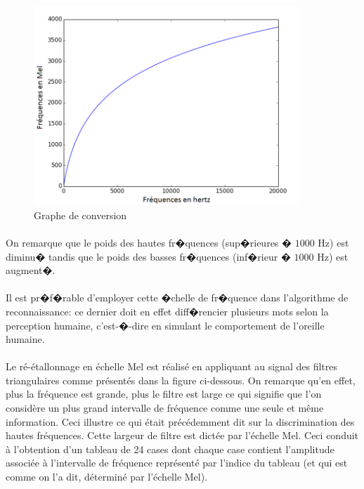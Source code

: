         	\begin{figure}[H]
						\begin{center}
							\includegraphics[width=10cm]{Images/Mel.png} 
						\end{center}
						\caption{Graphe de conversion}
			\end{figure}
        	\paragraph{}
        	On remarque que le poids des hautes fr�quences (sup�rieures � $1 000$ Hz) est diminu� tandis que le poids des basses fr�quences (inf�rieur � $1 000$ Hz) est augment�.
\paragraph{}
	Il est pr�f�rable d'employer cette �chelle de fr�quence dans l'algorithme de reconnaissance: ce dernier doit en effet diff�rencier plusieurs mots selon la perception humaine, c'est-�-dire en simulant le comportement de l'oreille humaine.

\paragraph{}
	Le ré-étallonnage en échelle Mel est réalisé en appliquant au signal des filtres triangulaires comme présentés
	dans la figure ci-dessous. On remarque qu'en effet, plus la fréquence est grande, plus le filtre est large ce qui 
	signifie que l'on considère un plus grand intervalle de fréquence comme une seule et même information. Ceci 
	illustre ce qui était précédemment dit sur la discrimination des hautes fréquences. Cette largeur de filtre est 
	dictée par l'échelle Mel. Ceci conduit à l'obtention d'un tableau de 24 cases dont chaque case contient l'amplitude 
	associée à l'intervalle de fréquence représenté par l'indice du tableau (et qui est comme on l'a dit, déterminé
	par l'échelle Mel).
